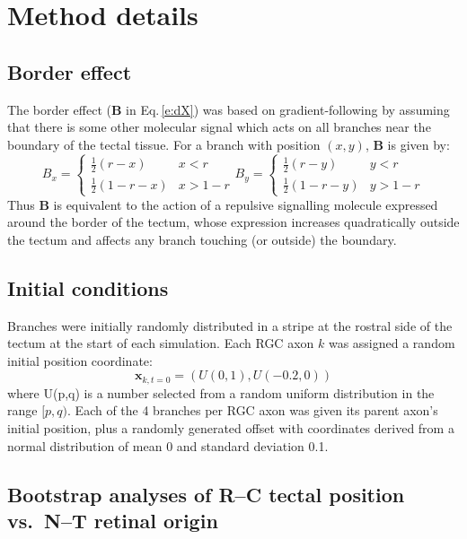 \documentclass[9pt,lineno,draft]{elife}
\begin{document}
\section{Method details}

\subsection*{Border effect} %
The border effect ($\mathbf{B}$ in Eq.\,\ref{e:dX}) was based on gradient-following by assuming that there is some other molecular signal which acts on all branches near the boundary of the tectal tissue. For a branch with position $(x,y)$, $\mathbf{B}$ is given by:
%
\begin{equation}\label{e:B}
B_x = \begin{cases}
        \frac{1}{2} (r-x)     & x<r \\
        \frac{1}{2} (1-r-x)    & x>1-r
\end{cases}
B_y = \begin{cases}
        \frac{1}{2} (r-y)      & y<r \\
        \frac{1}{2} (1-r-y)    & y>1-r
\end{cases}
\end{equation}
%
Thus $\mathbf{B}$ is equivalent to the action of a repulsive signalling molecule expressed around the border of the tectum, whose expression increases quadratically outside the tectum and affects any branch touching (or outside) the boundary.

\subsection*{Initial conditions}
Branches were initially randomly distributed in a stripe at the rostral side of the tectum at the start of each simulation.
Each RGC axon $k$ was assigned a random initial position coordinate:
\begin{equation}\label{e:ic}
\mathbf{x}_{k,t=0} = (U(0,1), U(-0.2,0))
\end{equation}
where U(p,q) is a number selected from a random uniform distribution in the range $[p,q)$. Each of the 4 branches per RGC axon was given its parent axon's initial position, plus a randomly generated offset with coordinates derived from a normal distribution of mean 0 and standard deviation 0.1.

\subsection*{Bootstrap analyses of R--C tectal position vs.~N--T retinal origin}
\end{document}
